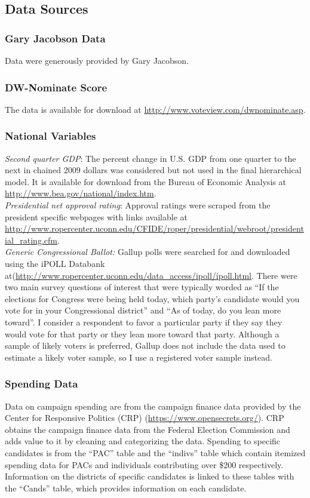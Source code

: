 \documentclass[12pt,final,fleqn]{article}
\theoremstyle{plain}
\begin{document}
\subsection{Data Sources}
\subsubsection{Gary Jacobson Data}
Data were generously provided by Gary Jacobson.

\subsubsection{DW-Nominate Score}
The data is available for download at \url{http://www.voteview.com/dwnominate.asp}.

\subsubsection{National Variables}
\emph{Second quarter GDP}: The percent change in U.S. GDP from one quarter to the next in chained 2009 dollars was considered but not used in the final hierarchical model. It is available for download from the Bureau of Economic Analysis at \url{http://www.bea.gov/national/index.htm}. \\
\emph{Presidential net approval rating}: Approval ratings were scraped from the president specific webpages with links available at \url{http://www.ropercenter.uconn.edu/CFIDE/roper/presidential/webroot/presidential_rating.cfm}. \\
\emph{Generic Congressional Ballot:} Gallup polls were searched for and downloaded using the iPOLL Databank at(\url{http://www.ropercenter.uconn.edu/data_access/ipoll/ipoll.html}. There were two main survey questions of interest that were typically worded as ``If the elections for Congress were being held today, which party's candidate would you vote for in your 
Congressional district'' and ``As of today, do you lean more toward''. I consider a respondent to favor a particular party if they say they would vote for that party or they lean more toward that party. Although a sample of likely voters is preferred, Gallup does not include the data used to estimate a likely voter sample, so I use a registered voter sample instead.

\subsubsection{Spending Data}
Data on campaign spending are from the campaign finance data provided by the Center for Responsive Politics (CRP) (\url{https://www.opensecrets.org/}). CRP obtains the campaign finance data from the Federal Election Commission and adds value to it by cleaning and categorizing the data. Spending to specific candidates is from the ``PAC'' table and the ``indivs'' table which contain itemized spending data for PACs and individuals contributing over \$200 respectively. Information on the districts of specific candidates is linked to these tables with the ``Cands'' table, which provides information on each candidate. 
\end{document}
